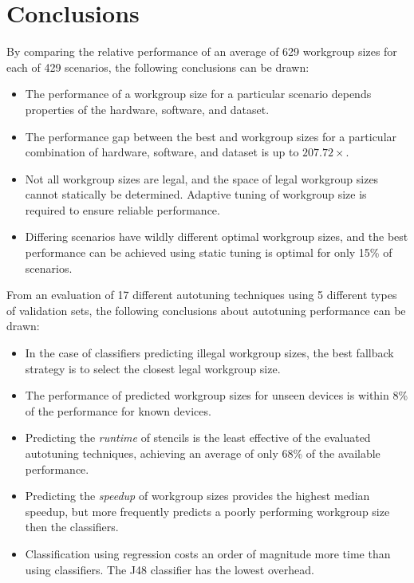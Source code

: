 \documentclass[nonatbib,preprint,10pt]{sigplanconf}
\begin{document}
\section{Conclusions}\label{sec:conclusions}


By comparing the relative performance of an average of 629 workgroup
sizes for each of 429 scenarios, the following conclusions can be
drawn:
%
\begin{itemize}
\item The performance of a workgroup size for a particular scenario
  depends properties of the hardware, software, and dataset.
\item The performance gap between the best and workgroup sizes for a
  particular combination of hardware, software, and dataset is up to
  $207.72\times$.
\item Not all workgroup sizes are legal, and the space of legal
  workgroup sizes cannot statically be determined. Adaptive tuning of
  workgroup size is required to ensure reliable performance.
\item Differing scenarios have wildly different optimal workgroup
  sizes, and the best performance can be achieved using static tuning
  is optimal for only 15\% of scenarios.
\end{itemize}
%
From an evaluation of 17 different autotuning techniques using 5
different types of validation sets, the following conclusions about
autotuning performance can be drawn:
%
\begin{itemize}
\item In the case of classifiers predicting illegal workgroup sizes,
  the best fallback strategy is to select the closest legal workgroup
  size.
\item The performance of predicted workgroup sizes for unseen devices
  is within 8\% of the performance for known devices.
\item Predicting the \emph{runtime} of stencils is the least effective
  of the evaluated autotuning techniques, achieving an average of only
  68\% of the available performance.
\item Predicting the \emph{speedup} of workgroup sizes provides the
  highest median speedup, but more frequently predicts a poorly
  performing workgroup size then the classifiers.
\item Classification using regression costs an order of magnitude more
  time than using classifiers. The J48 classifier has the lowest
  overhead.
\end{itemize}
\end{document}
